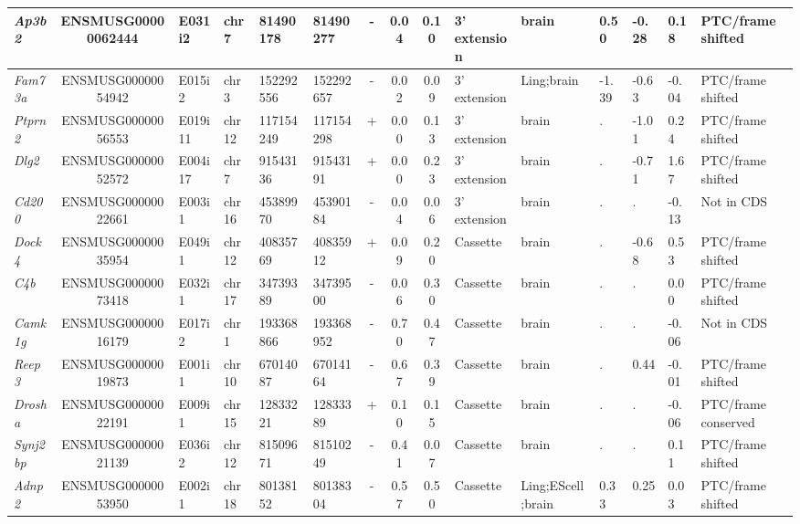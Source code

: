 \begin{appendices}
\begin{landscape}
\begin{table}[htbp]
{\begin{tabular}{|l|c|l|l|l|l|c|c|c|l|l|l|l|l|l|}
		\textit{Ap3b2} & ENSMUSG00000062444 & E031i2 & chr7  & 81490178 & 81490277 & -     & 0.04  & 0.10  & 3' extension & brain & 0.50  & -0.28 & 0.18  & PTC/frame shifted \\ \hline
		\textit{Fam73a} & ENSMUSG00000054942 & E015i2 & chr3  & 152292556 & 152292657 & -     & 0.02  & 0.09  & 3' extension & Ling;brain & -1.39 & -0.63 & -0.04 & PTC/frame shifted \\ \hline
		\textit{Ptprn2} & ENSMUSG00000056553 & E019i11 & chr12 & 117154249 & 117154298 & +     & 0.00  & 0.13  & 3' extension & brain & .     & -1.01 & 0.24  & PTC/frame shifted \\ \hline
		\textit{Dlg2} & ENSMUSG00000052572 & E004i17 & chr7  & 91543136 & 91543191 & +     & 0.00  & 0.23  & 3' extension & brain & .     & -0.71 & 1.67  & PTC/frame shifted \\ \hline
		\textit{Cd200} & ENSMUSG00000022661 & E003i1 & chr16 & 45389970 & 45390184 & -     & 0.04  & 0.06  & 3' extension & brain & .     & .     & -0.13 & Not in CDS \\ \hline
		\textit{Dock4} & ENSMUSG00000035954 & E049i1 & chr12 & 40835769 & 40835912 & +     & 0.09  & 0.20  & Cassette & brain & .     & -0.68 & 0.53  & PTC/frame shifted \\ \hline
		\textit{C4b} & ENSMUSG00000073418 & E032i1 & chr17 & 34739389 & 34739500 & -     & 0.06  & 0.30  & Cassette & brain & .     & .     & 0.00  & PTC/frame shifted \\ \hline
		\textit{Camk1g} & ENSMUSG00000016179 & E017i2 & chr1  & 193368866 & 193368952 & -     & 0.70  & 0.47  & Cassette & brain & .     & .     & -0.06 & Not in CDS  \\ \hline
		\textit{Reep3} & ENSMUSG00000019873 & E001i1 & chr10 & 67014087 & 67014164 & -     & 0.67  & 0.39  & Cassette & brain & .     & 0.44  & -0.01 & PTC/frame shifted \\ \hline
		\textit{Drosha} & ENSMUSG00000022191 & E009i1 & chr15 & 12833221 & 12833389 & +     & 0.10  & 0.15  & Cassette & brain & .     & .     & -0.06 & PTC/frame conserved \\ \hline
		\textit{Synj2bp} & ENSMUSG00000021139 & E036i2 & chr12 & 81509671 & 81510249 & -     & 0.41  & 0.07  & Cassette & brain & .     & .     & 0.11  & PTC/frame shifted \\ \hline
		\textit{Adnp2} & ENSMUSG00000053950 & E002i1 & chr18 & 80138152 & 80138304 & -     & 0.57  & 0.50  & Cassette & Ling;EScell;brain & 0.33  & 0.25  & 0.03  & PTC/frame shifted \\ \hline

\end{tabular}}
\end{table}
\end{landscape}
\end{appendices}
